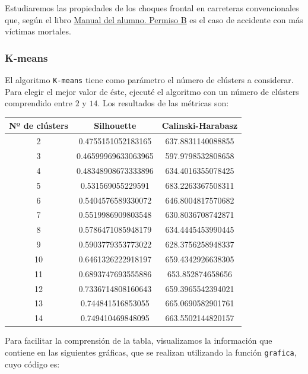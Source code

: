 \documentclass[a4]{article}
\begin{document}
Estudiaremos las propiedades de los choques frontal en carreteras convencionales que, según el libro \href{https://www.todostuslibros.com/libros/manual-del-alumno-permiso-b-facilauto_978-84-09-08551-4}{Manual del alumno. Permiso B} es el caso de accidente con más víctimas mortales.

\subsubsection{K-means}

El algoritmo \texttt{K-means} tiene como parámetro el número de clústers a considerar. Para elegir el mejor valor de éste, ejecuté el algoritmo con un número de clústers comprendido entre $2$ y $14$. Los resultados de las métricas son:

\begin{center}
\begin{tabular}{|c|c|c|}
\hline
\multicolumn{1}{|c|}{\textbf{Nº de clústers}}& \textbf{Silhouette} & \textbf{Calinski-Harabasz}\\ \hline
  2  & 0.4755151052183165  & 637.8831140088855  \\ \hline
  3  & 0.46599969633063965 & 597.9798532808658  \\ \hline
  4  & 0.48348908673333896 & 634.4016355078425  \\ \hline
  5  & 0.531569055229591   & 683.2263367508311  \\ \hline
  6  & 0.5404576589330072  & 646.8004817570682  \\ \hline
  7  & 0.5519986909803548  & 630.8036708742871  \\ \hline
  8  & 0.5786471085948179  & 634.4445453990445  \\ \hline
  9  & 0.5903779353773022  & 628.3756258948337  \\ \hline
 10  & 0.6461326222918197  & 659.4342926638305  \\ \hline
 11  & 0.6893747693555886  & 653.852874658656   \\ \hline
 12  & 0.7336714808160643  & 659.3965542394021  \\ \hline
 13  & 0.744841516853055   & 665.0690582901761  \\ \hline
 14  & 0.749410469848095   & 663.5502144820157  \\ \hline
\end{tabular}
\end{center}

Para facilitar la comprensión de la tabla, visualizamos la información que contiene en las siguientes gráficas, que se realizan utilizando la función \texttt{grafica}, cuyo código es:
\end{document}
